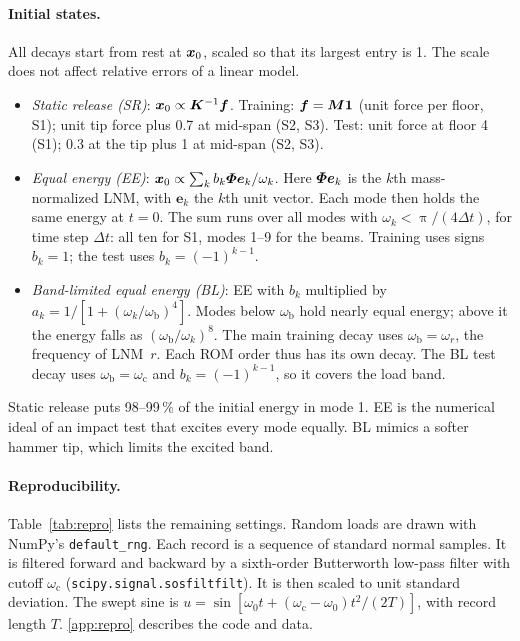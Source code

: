 \documentclass[preprint,12pt]{elsarticle}
\begin{document}
\paragraph{Initial states.} All decays start from rest at $\bm{x}_0$, scaled so that its largest entry is 1. The scale does not affect relative errors of a linear model.
\begin{itemize}
\item \emph{Static release (SR)}: $\bm{x}_0\propto\bm{K}^{-1}\bm{f}$. Training: $\bm{f}=\bm{M}\mathbf 1$ (unit force per floor, S1); unit tip force plus 0.7 at mid-span (S2, S3). Test: unit force at floor 4 (S1); 0.3 at the tip plus 1 at mid-span (S2, S3).
\item \emph{Equal energy (EE)}: $\bm{x}_0\propto\sum_k b_k\bm{\varPhi}\bm{e}_k/\omega_k$. Here $\bm{\varPhi}\bm{e}_k$ is the $k$th mass-normalized LNM, with $\bm{e}_k$ the $k$th unit vector. Each mode then holds the same energy at $t=0$. The sum runs over all modes with $\omega_k<\uppi/(4\Delta t)$, for time step $\Delta t$: all ten for S1, modes 1--9 for the beams. Training uses signs $b_k=1$; the test uses $b_k=(-1)^{k-1}$.
\item \emph{Band-limited equal energy (BL)}: EE with $b_k$ multiplied by $a_k=1/[1+(\omega_k/\omega_{\mathrm b})^4]$. Modes below $\omega_{\mathrm b}$ hold nearly equal energy; above it the energy falls as $(\omega_{\mathrm b}/\omega_k)^8$. The main training decay uses $\omega_{\mathrm b}=\omega_r$, the frequency of LNM~$r$. Each ROM order thus has its own decay. The BL test decay uses $\omega_{\mathrm b}=\omega_{\mathrm c}$ and $b_k=(-1)^{k-1}$, so it covers the load band.
\end{itemize}
Static release puts 98--99\,\% of the initial energy in mode 1. EE is the numerical ideal of an impact test that excites every mode equally. BL mimics a softer hammer tip, which limits the excited band.

\paragraph{Reproducibility.} Table~\ref{tab:repro} lists the remaining settings. Random loads are drawn with NumPy's \texttt{default\_rng}. Each record is a sequence of standard normal samples. It is filtered forward and backward by a sixth-order Butterworth low-pass filter with cutoff $\omega_{\mathrm c}$ (\texttt{scipy.signal.sosfiltfilt}). It is then scaled to unit standard deviation. The swept sine is $u=\sin[\omega_0t+(\omega_{\mathrm c}-\omega_0)t^2/(2T)]$, with record length $T$. \ref{app:repro} describes the code and data.
\end{document}
